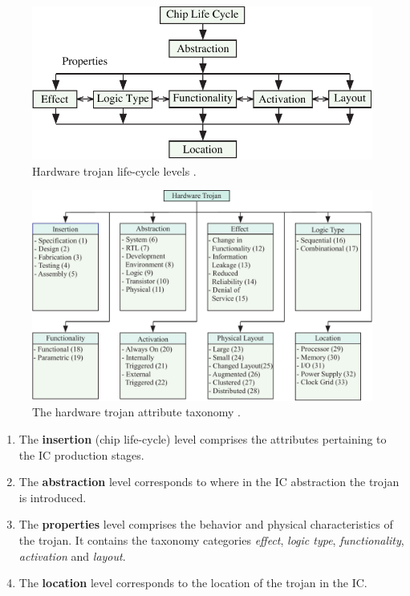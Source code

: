 \documentclass[journal, hidelinks]{IEEEtran}
\begin{document}
\begin{figure}[h]
	\centering
	\includegraphics[width=0.99\linewidth]{Figures/trojan_life_cycle}
	\caption{Hardware trojan life-cycle levels \cite{samerAttribute}.}
	\label{fig:trojan_life_cycle}
\end{figure}
\begin{figure}[]
	\centering
	\includegraphics[width=0.7\linewidth]{Figures/HW_trojan}
	\caption{The hardware trojan attribute taxonomy \cite{samerAttribute}.}
	\label{fig:HW_trojan}
\end{figure}
\begin{enumerate}
	\item The \textbf{insertion} (chip life-cycle) level comprises the attributes pertaining to the IC production stages.
	\item The \textbf{abstraction} level corresponds to where in the IC abstraction the trojan is introduced.
	\item The \textbf{properties} level comprises the behavior and physical characteristics of the trojan.
	It contains the taxonomy categories \textit{effect}, \textit{logic type}, \textit{functionality}, \textit{activation} and \textit{layout}.
	\item The \textbf{location} level corresponds to the location of the trojan in the IC.
\end{enumerate}
\end{document}
